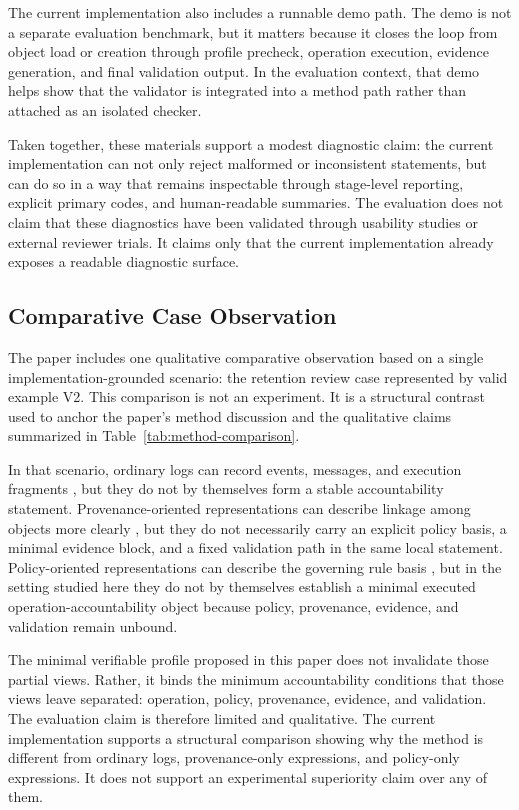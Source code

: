 The current implementation also includes a runnable demo path. The demo is not a separate evaluation benchmark, but it matters because it closes the loop from object load or creation through profile precheck, operation execution, evidence generation, and final validation output. In the evaluation context, that demo helps show that the validator is integrated into a method path rather than attached as an isolated checker.

Taken together, these materials support a modest diagnostic claim: the current implementation can not only reject malformed or inconsistent statements, but can do so in a way that remains inspectable through stage-level reporting, explicit primary codes, and human-readable summaries. The evaluation does not claim that these diagnostics have been validated through usability studies or external reviewer trials. It claims only that the current implementation already exposes a readable diagnostic surface.

\subsection{Comparative Case Observation}

The paper includes one qualitative comparative observation based on a single implementation-grounded scenario: the retention review case represented by valid example V2. This comparison is not an experiment. It is a structural contrast used to anchor the paper's method discussion and the qualitative claims summarized in Table~\ref{tab:method-comparison}.



In that scenario, ordinary logs can record events, messages, and execution fragments \cite{oliner2012loganalysis}, but they do not by themselves form a stable accountability statement. Provenance-oriented representations can describe linkage among objects more clearly \cite{moreau2013provdm}, but they do not necessarily carry an explicit policy basis, a minimal evidence block, and a fixed validation path in the same local statement. Policy-oriented representations can describe the governing rule basis \cite{iannella2018odrl}, but in the setting studied here they do not by themselves establish a minimal executed operation-accountability object because policy, provenance, evidence, and validation remain unbound.

The minimal verifiable profile proposed in this paper does not invalidate those partial views. Rather, it binds the minimum accountability conditions that those views leave separated: operation, policy, provenance, evidence, and validation. The evaluation claim is therefore limited and qualitative. The current implementation supports a structural comparison showing why the method is different from ordinary logs, provenance-only expressions, and policy-only expressions. It does not support an experimental superiority claim over any of them.

